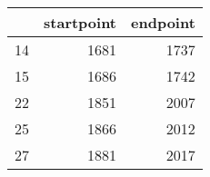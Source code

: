 % 
\begin{tabular}{rrr}
  \hline
 & startpoint & endpoint \\ 
  \hline
14 & 1681 & 1737 \\ 
  15 & 1686 & 1742 \\ 
  22 & 1851 & 2007 \\ 
  25 & 1866 & 2012 \\ 
  27 & 1881 & 2017 \\ 
   \hline
\end{tabular}
